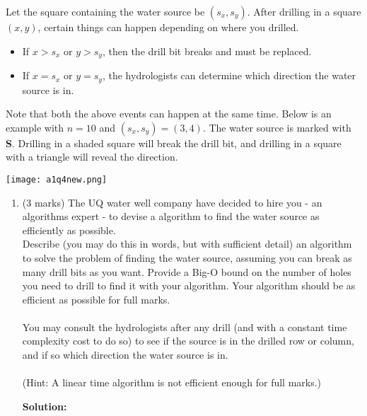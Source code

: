 \documentclass[a4,13pt]{extarticle}
\newenvironment{Solution}{\color{blue}\textbf{Solution:}}{}
\begin{document}
\begin{enumerate}
	      Let the square containing the water source be $(s_x,s_y)$. After drilling in a square $(x,y)$, certain things can 
	      happen depending on where you drilled.
	      \begin{itemize}
	      	\item If $x > s_x$ or $y > s_y$, then the drill bit breaks and must be replaced.
	      	\item If $x=s_x$ or $y=s_y$, the hydrologists can determine which direction the water source is in.
	      \end{itemize}
	      	              
	      Note that both the above events can happen at the same time. Below is an example with $n=10$ and $(s_x, s_y)=(3, 4)$. 
	      The water source is marked with \textsf{\textbf{S}}. Drilling in a shaded square will break the drill bit, and drilling in 
	      a square with a triangle will reveal the direction.
	      \begin{center}
	      	\texttt{[image: a1q4new.png]}
	      \end{center}
	      	              
	      \begin{enumerate} 
	      	\item (3 marks) The UQ water well company have decided to hire you - an algorithms expert - to devise a algorithm 
	      	      to find the water source as efficiently as possible. \\
	      	      	      	              
	      	      Describe (you may do this in words, but with sufficient detail) an algorithm to solve the problem of finding the water source, 
	      	      assuming you can break as many drill bits as you want. Provide a Big-O bound on the number of holes you need to drill to find 
	      	      it with your algorithm. Your algorithm should be as efficient as possible for full marks.\\\\
	      	      You may consult the hydrologists after any drill (and with a constant time complexity cost to do so) to see if 
	      	      the source is in the drilled row or column, and if so which direction the water source is in.\\\\
	      	      (Hint: A linear time algorithm is not efficient enough for full marks.)
	      	
	      	\begin{Solution}
	      	

\end{Solution}
\end{enumerate}
\end{enumerate}
\end{document}
